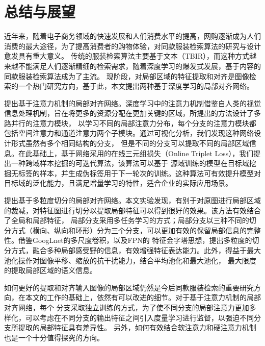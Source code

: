 \chapter{总结与展望}
近年来，随着电子商务领域的快速发展和人们消费水平的提高，网购逐渐成为人们消费的最大途径，为了提高消费者的购物体验，对同款服装检索算法的研究与设计愈发具有重大意义。
传统的服装检索算法主要基于文本（TBIR），而这种方式越来越不能满足人们逐渐精细的检索需求，随着深度学习的爆发式发展，基于内容的同款服装检索算法成为了主流。
现阶段，对局部区域的特征提取和对齐是图像检索的一个热门研究方向，基于此，本文提出两种基于深度学习的局部对齐网络。

提出基于注意力机制的局部对齐网络。深度学习中的注意力机制借鉴自人类的视觉信息处理机制，旨在将更多的资源分配在更加关键的区域，所提出的方法设计了多路并行的注意力模块，
以学习不同的局部注意力分布，每个分支的注意力模块都包括空间注意力和通道注意力两个子模块。通过可视化分析，我们发现这种网络设计形式虽然有多个相同结构的分支，
但是不同的分支可以提取不同的局部区域信息。在此基础上，基于网络采用的在线三元组损失（Online Triplet Loss），我们提出一种跨域样本挖掘的可迭代算法，该算法可以基于
源域训练的模型在目标域挖掘无标签的样本，并生成伪标签用于下一轮次的训练。这种算法可有效提升模型对目标域的泛化能力，且满足增量学习的特性，适合企业的实际应用场景。

提出基于多粒度切分的局部对齐网络。本文实验发现，有别于对原图进行局部区域的裁减，对特征图进行切分以提取局部特征可以得到很好的效果。该方法有效结合了全局和局部特征，
局部分支采用多任务学习的方式；局部分支以三种不同的切分方式（横向、纵向和环形）分为三个分支，可以更加有效的保留局部信息的完整性。借鉴GoogLnet的多尺度卷积，以及FPN的
特征金字塔思想，提出多粒度的切分方式，融合多种局部感受野的信息，有效增强特征表达能力。此外，得益于最大池化操作对图像平移、缩放的抗干扰能力，结合平均池化和最大池化，
最大限度的提取局部区域的语义信息。

如何更好的提取和对齐输入图像的局部区域仍然是今后同款服装检索的重要研究方向，在本文的工作的基础上，依然有可以改进的细节。对于基于注意力机制的局部对齐网络，每个
分支采取独立训练的方式，为了使不同分支的局部注意力更加多样化，可以考虑在不同分支的输出特征之间引入度量学习进行监督，以强迫不同分支所提取的局部特征具有差异性。
另外，如何有效结合软注意力和硬注意力机制也是一个十分值得探究的方向。
